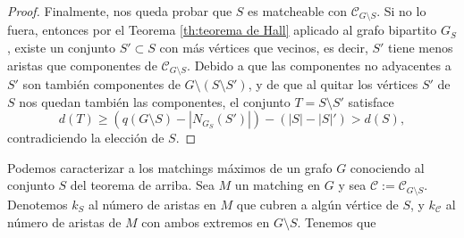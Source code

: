 \documentclass[12pt]{report}
\theoremstyle{plain}
\theoremstyle{definition}
\newcommand{\abs}[1]{\left \vert #1 \right \vert}
\begin{document}
\begin{proof}
Finalmente, nos queda probar que $S$ es matcheable con $\mathcal C _{G \setminus S}$. Si no lo fuera, entonces por el Teorema \ref{th:teorema de Hall} aplicado al grafo bipartito $G_S$, existe un conjunto $S' \subset S$ con más vértices que vecinos, es decir, $S'$ tiene menos aristas que componentes de $\mathcal C_{G \setminus S}$. Debido a que las componentes no adyacentes a $S'$ son también componentes de $G \setminus (S \setminus S')$, y de que al quitar los vértices $S'$ de $S$ nos quedan también las componentes, el conjunto $T = S \setminus S'$ satisface
\[
    d(T) \geq (q(G \setminus S) - \abs{N_{G_S} (S')}) - (\abs S - \abs S') > d(S),
\]
contradiciendo la elección de $S$.
\end{proof}

Podemos caracterizar a los matchings máximos de un grafo $G$ conociendo al conjunto $S$ del teorema de arriba. Sea $M$ un matching en $G$ y sea $\mathcal C := \mathcal C_{G \setminus S}$. Denotemos $k_S$ al número de aristas en $M$ que cubren a algún vértice de $S$, y $k_{\mathcal C}$ al número de aristas de $M$ con ambos extremos en $G \setminus S$. Tenemos que
\end{document}
